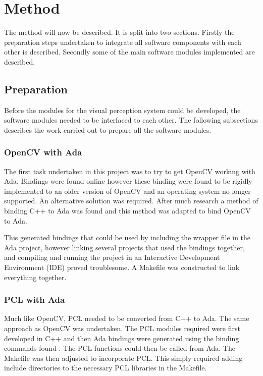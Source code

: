 \section{Method}\label{sec:method}
The method will now be described. It is split into two sections. Firstly the preparation steps undertaken to integrate all software components with each other is described. Secondly some of the main software modules implemented are described.
\subsection{Preparation}
Before the modules for the visual perception system could be developed, the software modules needed to be interfaced to each other. The following subsections describes the work carried out to prepare all the software modules.
\subsubsection{OpenCV with Ada}
The first task undertaken in this project was to try to get OpenCV working with Ada. Bindings were found online \cite{web:oldAdaBindings} however these binding were found to be rigidly implemented to an older version of OpenCV and an operating system no longer supported. An alternative solution was required. After much research a method of binding C++ to Ada was found \cite{web:newAdaBindings} and this method was adapted to bind OpenCV to Ada.

This generated bindings that could be used by including the wrapper file in the Ada project, however linking several projects that used the bindings together, and compiling and running the project in an Interactive Development Environment (IDE) proved troublesome. A Makefile was constructed to link everything together.

\subsubsection{PCL with Ada}
Much like OpenCV, PCL needed to be converted from C++ to Ada. The same approach as OpenCV was undertaken. The PCL modules required were first developed in C++ and then Ada bindings were generated using the binding commands found \cite{web:newAdaBindings}. The PCL functions could then be called from Ada. The Makefile was then adjusted to incorporate PCL. This simply required adding include directories to the necessary PCL libraries in the Makefile. 

